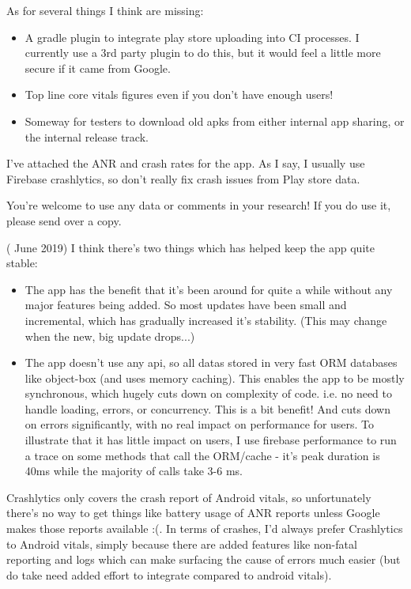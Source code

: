 As for several things I think are missing:

\begin{itemize}
    \item A gradle plugin to integrate play store uploading into CI processes. I currently use a 3rd party plugin to do this, but it would feel a little more secure if it came from Google.
    \item Top line core vitals figures even if you don't have enough users!
    \item Someway for testers to download old apks from either internal app sharing, or the internal release track.
\end{itemize}

I've attached the ANR and crash rates for the app. As I say, I usually use Firebase crashlytics, so don't really fix crash issues from Play store data.

You're welcome to use any data or comments in your research! If you do use it, please send over a copy.

( June 2019)
I think there's two things which has helped keep the app quite stable:
\begin{itemize}
    \item The app has the benefit that it's been around for quite a while without any major features being added. So most updates have been small and incremental, which has gradually increased it's stability. (This may change when the new, big update drops...)
    \item The app doesn't use any api, so all datas stored in very fast ORM databases like object-box (and uses memory caching). This enables the app to be mostly synchronous, which hugely cuts down on complexity of code. i.e. no need to handle loading, errors, or concurrency. This is a bit benefit! And cuts down on errors significantly, with no real impact on performance for users. To illustrate that it has little impact on users, I use firebase performance to run a trace on some methods that call the ORM/cache - it's peak duration is 40ms while the majority of calls take 3-6 ms.
\end{itemize} 

Crashlytics only covers the crash report of Android vitals, so unfortunately there's no way to get things like battery usage of ANR reports unless Google makes those reports available :(. In terms of crashes, I'd always prefer Crashlytics to Android vitals, simply because there are added features like non-fatal reporting and logs which can make surfacing the cause of errors much easier (but do take need added effort to integrate compared to android vitals).

